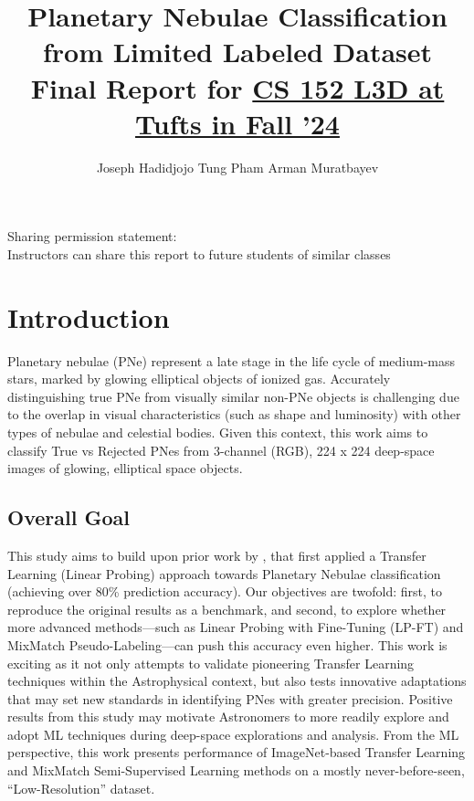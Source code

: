 \documentclass{article}
\title{Planetary Nebulae Classification from Limited Labeled Dataset
\\ {\small Final Report for \href{https://www.cs.tufts.edu/cs/152L3D/2024f}{CS 152 L3D at Tufts in Fall '24}}
}
\author{Joseph Hadidjojo \And Tung Pham \And Arman Muratbayev
}
\begin{document}
\maketitle



Sharing permission statement:
\\ {\small Instructors can share this report to future students of similar classes}

\section{Introduction}


Planetary nebulae (PNe) represent a late stage in the life cycle of medium-mass stars, marked by glowing elliptical objects of ionized gas. Accurately distinguishing true PNe from visually similar non-PNe objects is challenging due to the overlap in visual characteristics (such as shape and luminosity) with other types of nebulae and celestial bodies. Given this context, this work aims to classify True vs Rejected PNes from 3-channel (RGB), 224 x 224 deep-space images of glowing, elliptical space objects.

\subsection{Overall Goal}

This study aims to build upon prior work by \cite{awangiskandar2020}, that first applied a Transfer Learning (Linear Probing) approach towards Planetary Nebulae classification (achieving over 80\% prediction accuracy). Our objectives are twofold: first, to reproduce the original results as a benchmark, and second, to explore whether more advanced methods—such as Linear Probing with Fine-Tuning (LP-FT) and MixMatch Pseudo-Labeling—can push this accuracy even higher. This work is exciting as it not only attempts to validate pioneering Transfer Learning techniques within the Astrophysical context, but also tests innovative adaptations that may set new standards in identifying PNes with greater precision. Positive results from this study may motivate Astronomers to more readily explore and adopt ML techniques during deep-space explorations and analysis. From the ML perspective, this work presents performance of ImageNet-based Transfer Learning and MixMatch Semi-Supervised Learning methods on a mostly never-before-seen, “Low-Resolution” dataset.
\end{document}
